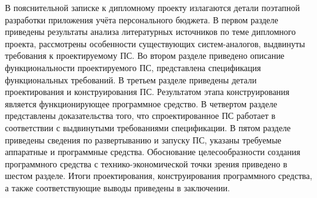 В пояснительной записке к дипломному проекту излагаются детали поэтапной разработки приложения учёта персонального бюджета.
В первом разделе приведены результаты анализа литературных источников по теме дипломного проекта, рассмотрены особенности существующих систем-аналогов, выдвинуты требования к проектируемому ПС.
Во втором разделе приведено описание функциональности проектируемого ПС, представлена спецификация функциональных требований.
В третьем разделе приведены детали проектирования и конструирования ПС.
Результатом этапа конструирования является функционирующее программное средство.
В четвертом разделе представлены доказательства того, что спроектированное ПС работает в соответствии с выдвинутыми требованиями спецификации.
В пятом разделе приведены сведения по развертыванию и запуску ПС, указаны требуемые аппаратные и программные средства.
Обоснование целесообразности создания программного средства с технико-экономической точки зрения приведено в шестом разделе.
Итоги проектирования, конструирования программного средства, а также соответствующие выводы приведены в заключении.
